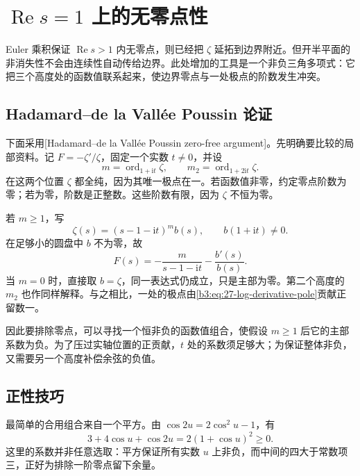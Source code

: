 \section{\texorpdfstring{\(\operatorname{Re}s=1\)}{Re(s)=1} 上的无零点性}
\label{b3:sec:2703}

Euler 乘积保证 \(\operatorname{Re}s>1\) 内无零点，则已经把 \(\zeta\) 延拓到边界附近。但开半平面的非消失性不会由连续性自动传给边界。此处增加的工具是一个非负三角多项式：它把三个高度处的函数值联系起来，使边界零点与一处极点的阶数发生冲突。

\subsection{Hadamard–de la Vallée Poussin 论证}
\label{b3:subsec:270301}

下面采用[Hadamard--de la Vallée Poussin zero-free argument]。先明确要比较的局部资料。记 \(F=-\zeta'/\zeta\)，固定一个实数 \(t\ne0\)，并设
\[
 m=\operatorname{ord}_{1+\mathrm it}\zeta,\qquad
 m_2=\operatorname{ord}_{1+2\mathrm it}\zeta.
\]
在这两个位置 \(\zeta\) 都全纯，因为其唯一极点在一。若函数值非零，约定零点阶数为零；若为零，阶数是正整数。这些阶数有限，因为 \(\zeta\) 不恒为零。

若 \(m\ge1\)，写
\[
 \zeta(s)=(s-1-\mathrm it)^m b(s),\qquad b(1+\mathrm it)\ne0.
\]
在足够小的圆盘中 \(b\) 不为零，故
\[
 F(s)=-\frac m{s-1-\mathrm it}-\frac{b'(s)}{b(s)}.
\]
当 \(m=0\) 时，直接取 \(b=\zeta\)，同一表达式仍成立，只是主部为零。第二个高度的 \(m_2\) 也作同样解释。与之相比，一处的极点由\eqref{b3:eq:27-log-derivative-pole}贡献正留数一。

因此要排除零点，可以寻找一个恒非负的函数值组合，使假设 \(m\ge1\) 后它的主部系数为负。为了压过实轴位置的正贡献，\(t\) 处的系数须足够大；为保证整体非负，又需要另一个高度补偿余弦的负值。

\subsection{正性技巧}
\label{b3:subsec:270302}

最简单的合用组合来自一个平方。由 \(\cos2u=2\cos^2u-1\)，有
\[
 3+4\cos u+\cos2u=2(1+\cos u)^2\ge0.
\]
这里的系数并非任意选取：平方保证所有实数 \(u\) 上非负，而中间的四大于常数项三，正好为排除一阶零点留下余量。


